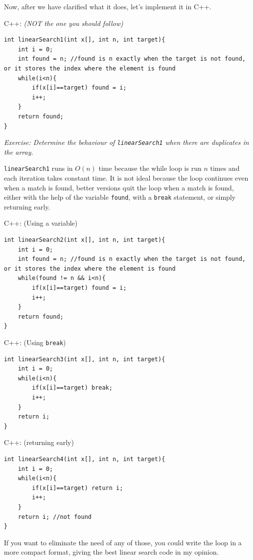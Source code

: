 Now, after we have clarified what it does, let's implement it in C++.
\vspace{6mm}

C++: \textit{(NOT the one you should follow)}
\begin{lstlisting}
int linearSearch1(int x[], int n, int target){
    int i = 0;
    int found = n; //found is n exactly when the target is not found, or it stores the index where the element is found
    while(i<n){
        if(x[i]==target) found = i;
        i++;
    }
    return found;
}
\end{lstlisting}

\textit{Exercise: Determine the behaviour of \texttt{linearSearch1} when there are duplicates in the array.}
\vspace{6mm}

\texttt{linearSearch1} runs in $O(n)$ time because the while loop is run $n$ times and each iteration takes constant time. It is not ideal because the loop continues even when a match is found, better versions quit the loop when a match is found, either with the help of the variable \texttt{found}, with a \texttt{break} statement, or simply returning early.
\vspace{6mm}

C++: (Using a variable)
\begin{lstlisting}
int linearSearch2(int x[], int n, int target){
    int i = 0;
    int found = n; //found is n exactly when the target is not found, or it stores the index where the element is found
    while(found != n && i<n){
        if(x[i]==target) found = i;
        i++;
    }
    return found;
}
\end{lstlisting}

C++: (Using \texttt{break})
\begin{lstlisting}
int linearSearch3(int x[], int n, int target){
    int i = 0;
    while(i<n){
        if(x[i]==target) break;
        i++;
    }
    return i;
}
\end{lstlisting}

C++: (returning early)
\begin{lstlisting}
int linearSearch4(int x[], int n, int target){
    int i = 0;
    while(i<n){
        if(x[i]==target) return i;
        i++;
    }
    return i; //not found
}
\end{lstlisting}

If you want to eliminate the need of any of those, you could write the loop in a more compact format, giving the best linear search code in my opinion.
\vspace{6mm}

